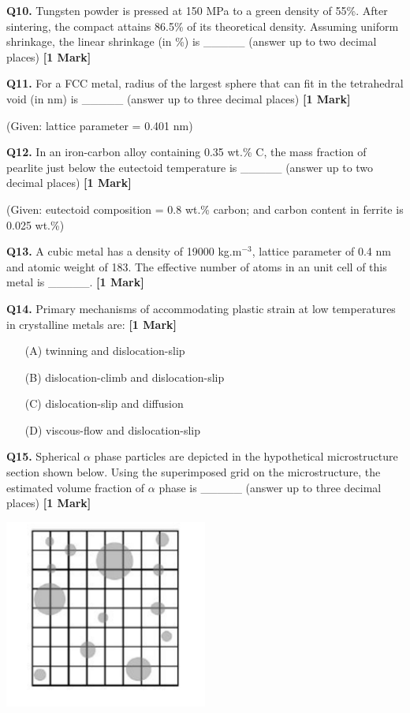 \documentclass[11pt]{article}
\newcommand{\questiona}[2]{
    \noindent\textbf{Q#2.} #1 \hfill \textbf{[1 Mark]}
}
\begin{document}
\questiona{Tungsten powder is pressed at 150 MPa to a green density of 55\%. After sintering, the compact attains 86.5\% of its theoretical density. Assuming uniform shrinkage, the linear shrinkage (in \%) is \_\_\_\_\_ (answer up to two decimal places)}{10}
\vspace{0.5cm}

\questiona{For a FCC metal, radius of the largest sphere that can fit in the tetrahedral void (in nm) is \_\_\_\_\_ (answer up to three decimal places)}{11}
(Given: lattice parameter = 0.401 nm)
\vspace{0.5cm}

\questiona{In an iron-carbon alloy containing 0.35 wt.\% C, the mass fraction of pearlite just below the eutectoid temperature is \_\_\_\_\_ (answer up to two decimal places)}{12}
(Given: eutectoid composition = 0.8 wt.\% carbon; and carbon content in ferrite is 0.025 wt.\%)
\vspace{0.5cm}

\questiona{A cubic metal has a density of 19000 kg.m\(^{-3}\), lattice parameter of 0.4 nm and atomic weight of 183. The effective number of atoms in an unit cell of this metal is \_\_\_\_\_.}{13}
\vspace{0.5cm}

\questiona{Primary mechanisms of accommodating plastic strain at low temperatures in crystalline metals are:}{14}
\begin{enumerate}
    \item[(A)] twinning and dislocation-slip
    \item[(B)] dislocation-climb and dislocation-slip
    \item[(C)] dislocation-slip and diffusion
    \item[(D)] viscous-flow and dislocation-slip
\end{enumerate}
\vspace{0.5cm}

\questiona{Spherical \(\alpha\) phase particles are depicted in the hypothetical microstructure section shown below. Using the superimposed grid on the microstructure, the estimated volume fraction of \(\alpha\) phase is \_\_\_\_\_ (answer up to three decimal places)}{15}
\begin{center}
\includegraphics[width=0.5\textwidth]{figures/15.png}
\end{center}
\vspace{0.5cm}
\end{document}
